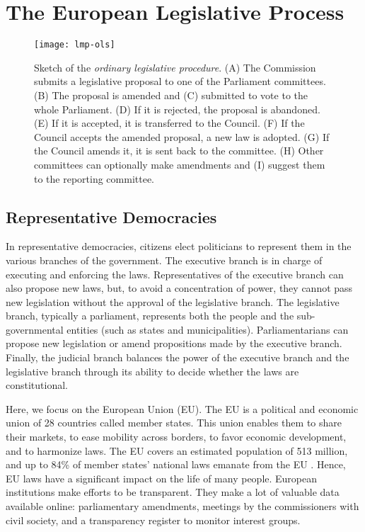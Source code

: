 \section{The European Legislative Process}
\label{sec:background}

\begin{figure}
	\newcommand{\imgscale}{0.35}
	\texttt{[image: lmp-ols]}
	\caption{
		Sketch of the \textit{ordinary legislative procedure}.
		(A) The Commission submits a legislative proposal to one of the Parliament committees.
		(B) The proposal is amended and (C) submitted to vote to the whole Parliament.
		(D) If it is rejected, the proposal is abandoned.
		(E) If it is accepted, it is transferred to the Council.
		(F) If the Council accepts the amended proposal, a new law is adopted.
		(G) If the Council amends it, it is sent back to the committee.
		(H) Other committees can optionally make amendments and (I) suggest them to the reporting committee.
	}
	\label{fig:ols}

\end{figure}

\subsection{Representative Democracies}

In representative democracies, citizens elect politicians to represent them in the various branches of the government.
The executive branch is in charge of executing and enforcing the laws.
Representatives of the executive branch can also propose new laws, but, to avoid a concentration of power, they cannot pass new legislation without the approval of the legislative branch.
The legislative branch, typically a parliament, represents both the people and the sub-governmental entities (such as states and municipalities).
Parliamentarians  can propose new legislation or amend propositions made by the executive branch.
Finally, the judicial branch balances the power of the executive branch and the legislative branch through its ability to decide whether the laws are constitutional.

Here, we focus on the European Union (EU).
The EU is a political and economic union of 28 countries called member states.
This union enables them to share their markets, to ease mobility across borders, to favor economic development, and to harmonize laws.
The EU covers an estimated population of 513 million, and up to 84\% of member states' national laws emanate from the EU \cite{miller2010much}.
Hence, EU laws have a significant impact on the life of many people.
European institutions make efforts to be transparent.
They make a lot of valuable data available online: parliamentary amendments, meetings by the commissioners with civil society, and a transparency register to monitor interest groups.


